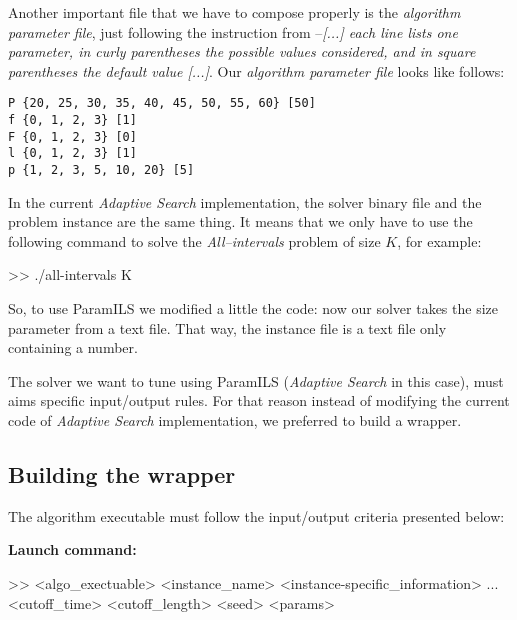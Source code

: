 Another important file that we have to compose properly is the {\it algorithm parameter file}, just following the instruction from \cite{Hutter2008} --\textit{[...] each line lists one parameter, in curly parentheses the possible values considered, and in square parentheses the default value [...]}. Our {\it algorithm parameter file} looks like follows:\\

\begin{shadedbox}
	\texttt{P \{20, 25, 30, 35, 40, 45, 50, 55, 60\} [50]\\
		f \{0, 1, 2, 3\} [1]\\
		F \{0, 1, 2, 3\} [0]\\
		l \{0, 1, 2, 3\} [1]\\
		p \{1, 2, 3, 5, 10, 20\} [5]
	}
\end{shadedbox}

In the current {\it Adaptive Search} implementation, the solver binary file and the problem instance are the same thing. It means that we only have to use the following command to solve the {\it All--intervals} problem of size $K$, for example: 

\begin{BGVerbatim}
>> ./all-intervals K
\end{BGVerbatim}

So, to use {\sc ParamILS} we modified a little the code: now our solver takes the size parameter from a text file. That way, the instance file is a text file only containing a number.

The solver we want to tune using {\sc ParamILS} ({\it Adaptive Search} in this case), must aims specific input/output rules. For that reason instead of modifying the current code of {\it Adaptive Search} implementation, we preferred to build a wrapper.

\subsection{Building the wrapper}

The algorithm executable must follow the input/output criteria presented below: 

\textbf{\large Launch command:} 

\begin{BGVerbatim}
>> <algo_exectuable> <instance_name> <instance-specific_information> ...
<cutoff_time> <cutoff_length> <seed> <params>
\end{BGVerbatim}

